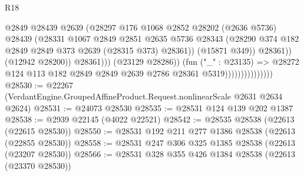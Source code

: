 \begin{lexlean}{R18}
\begin{coremodule}
                                              @2849
                                              @28439
                                              @2639
                                              (@28297
                                                @176
                                                @1068
                                                @2852
                                                @28202
                                                (@2636 @5736)
                                                @28439
                                                (@28331
                                                  @1067
                                                  @2849
                                                  @2851
                                                  @2635
                                                  @5736
                                                  @28343
                                                  (@28290
                                                    @374
                                                    @182
                                                    @2849
                                                    @2849
                                                    @373
                                                    @2639
                                                    (@28315 @373)
                                                    @28361))
                                                (@15871 @349))
                                              @28361))
                                          (@12942 @28200))
                                        @28361)))
                                  (@23129 @28286))
                                (fun ("_" : @23135) =>
                                @28272
                                  @124
                                  @113
                                  @182
                                  @2849
                                  @2849
                                  @2639
                                  @2786
                                  @28361
                                  @5319)))))))))))))))
@28530 := @22267 (VerdantEngine.GroupedAffineProduct.Request.nonlinearScale @2631 @2634 @2624)
@28531 := @24073 @28530
@28535 := @28531 @124 @139 @202 @1387
@28538 := @2939 @22145 (@4022 @22521)
@28542 := @28535 @28538 (@22613 (@22615 @28530))
@28550 := @28531 @192 @211 @277 @1386 @28538 (@22613 (@22855 @28530))
@28558 := @28531 @247 @306 @325 @1385 @28538 (@22613 (@23207 @28530))
@28566 := @28531 @328 @355 @426 @1384 @28538 (@22613 (@23370 @28530))

\end{coremodule}
\end{lexlean}
